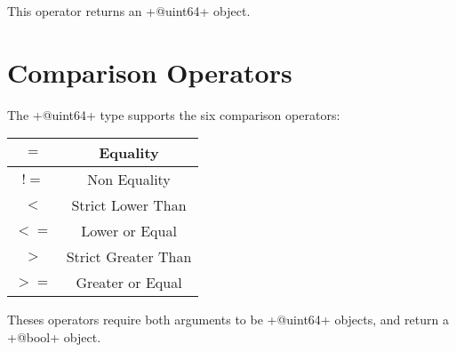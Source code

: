 This operator returns an \ggs+@uint64+ object.




\section{Comparison Operators}

The \ggs+@uint64+ type supports the six comparison operators:

\begin{tabular}{|c|c|}
\hline
$=$ & Equality \\
\hline
$!=$ & Non Equality \\
\hline
$<$  & Strict Lower Than \\
\hline
$<=$  & Lower or Equal \\
\hline
$>$  & Strict Greater Than \\
\hline
$>=$  & Greater or Equal \\
\hline
\end{tabular}

Theses operators require both arguments to be \ggs+@uint64+ objects, and return a \ggs+@bool+ object.
